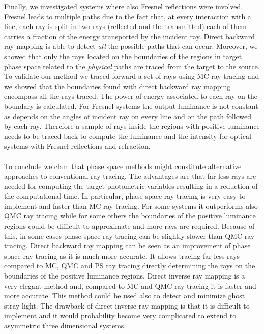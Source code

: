 Finally, we investigated systems where also Fresnel reflections were involved. Fresnel leads to multiple paths due to the fact that, at every interaction with a line, each ray is split in two rays (reflected and the transmitted) each of them carries a fraction of the energy transported by the incident ray. Direct backward ray mapping is able to detect \textit{all} the possible paths that can occur. Moreover, we showed that only the rays located on the boundaries of the regions in target phase space related to the \textit{physical} paths are traced from the target to the source. To validate our method we traced forward a set of rays using MC ray tracing and we showed that the boundaries found with direct backward ray mapping encompass all the rays traced. The power of energy associated to each ray on the boundary is calculated. For Fresnel systems the output luminance is not constant as depends on the angles of incident ray on every line and on the path followed by each ray. Therefore a sample of rays inside the regions with positive luminance needs to be traced back to compute the luminance and the intensity for optical systems with Fresnel reflections and refraction.
\\ \\ \indent To conclude we clam that phase space methods might constitute alternative approaches to conventional ray tracing. The advantages are that far less rays are needed for computing the target photometric variables resulting in a reduction of the computational time. In particular, phase space ray tracing is very easy to implement and faster than MC ray tracing. For some systems it outperforms also QMC ray tracing while for some others the boundaries of the positive luminance regions could be difficult to approximate and more rays are required. Because of this, in some cases phase space ray tracing can be slightly slower than QMC ray tracing. Direct backward ray mapping can be seen as an improvement of phase space ray tracing as it is much more accurate. It allows tracing far less rays compared to MC, QMC and PS ray tracing directly determining the rays on the boundaries of the positive luminance regions. Direct inverse ray mapping is a very elegant method and, compared to MC and QMC ray tracing it is faster and more accurate. This method could be used also to detect and minimize ghost stray light. The drawback of direct inverse ray mapping is that it is difficult to implement and it would probability become very complicated to extend to asymmetric three dimensional systems.
